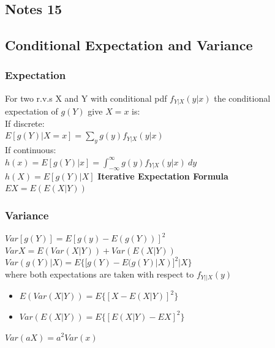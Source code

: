 \documentclass[openany]{book}
\begin{document}
\begin{flushleft}
\chapter{Notes 15}
\section{Conditional Expectation and Variance}
\subsection{Expectation}
For two r.v.s X and Y with conditional pdf $f_{Y|X}(y|x)$ the conditional expectation of $g(Y)$ give $X=x$ is:\\
If discrete:\\
$E[g(Y)|X=x]=\sum_{y}g(y)f_{Y|X}(y|x)$\\
If continuous:\\
$h(x)=E[g(Y)|x]=\int_{-\infty}^{\infty}g(y)f_{Y|X}(y|x) \ dy$\\
$h(X)=E[g(Y)|X]$\medbreak
\textbf{Iterative Expectation Formula}\\
$EX=E(E(X|Y))$
\subsection{Variance}
$Var[g(Y)]=E[g(y)-E(g(Y))]^2$\medbreak
$VarX=E(Var(X|Y))+Var(E(X|Y))$\medbreak
$Var(g(Y)|X)=E\{[g(Y)-E(g(Y)|X)]^2|X\}$\\
where both expectations are taken with respect to $f_{Y||X}(y)$\\
\begin{itemize}
\item $E(Var(X|Y))=E\{[X-E(X|Y)]^2\}$\\
\item $Var(E(X|Y))=E\{[E(X|Y)-EX]^2\}$\\
\end{itemize}
$Var(aX)=a^2 Var(x)$

\end{flushleft}
\end{document}
